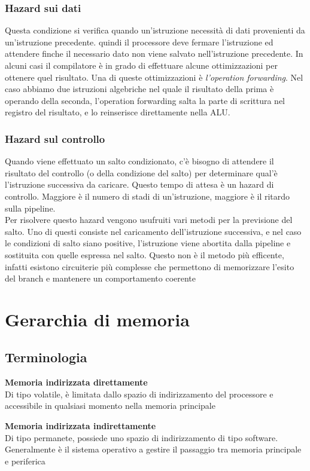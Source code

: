 \documentclass[12pt, a4paper]{article}
\begin{document}
\subsubsection{Hazard sui dati}
Questa condizione si verifica quando un'istruzione necessità di dati provenienti da un'istruzione precedente. 
quindi il processore deve fermare l'istruzione ed attendere finche il necessario dato non viene salvato
nell'istruzione precedente. In alcuni casi il compilatore è in grado di effettuare alcune ottimizzazioni per 
ottenere quel risultato. Una di queste ottimizzazioni è \textit{l'operation forwarding}. Nel caso abbiamo due 
istruzioni algebriche nel quale il risultato della prima è operando della seconda, l'operation forwarding salta 
la parte di scrittura nel registro del risultato, e lo reinserisce direttamente nella ALU. 

\subsubsection{Hazard sul controllo}
Quando viene effettuato un salto condizionato, c'è bisogno di attendere il risultato del controllo (o della 
condizione del salto) per determinare qual'è l'istruzione successiva da caricare. Questo tempo di attesa è un 
hazard di controllo. Maggiore è il numero di stadi di un'istruzione, maggiore è il ritardo sulla pipeline.\\
Per risolvere questo hazard vengono usufruiti vari metodi per la previsione del salto. Uno di questi consiste
nel caricamento dell'istruzione successiva, e nel caso le condizioni di salto siano positive, l'istruzione viene
abortita dalla pipeline e sostituita con quelle espressa nel salto. Questo non è il metodo più efficente, infatti
esistono circuiterie più complesse che permettono di memorizzare l'esito del branch e mantenere un comportamento
coerente

\newpage
\section{Gerarchia di memoria}
\subsection{Terminologia}
\textbf{Memoria indirizzata direttamente}\\Di tipo volatile, è limitata dallo spazio di indirizzamento del processore
e accessibile in qualsiasi momento nella memoria principale

\textbf{Memoria indirizzata indirettamente}\\Di tipo permanete, possiede uno spazio di indirizzamento di tipo 
software. Generalmente è il sistema operativo a gestire il passaggio tra memoria principale e periferica
\end{document}
